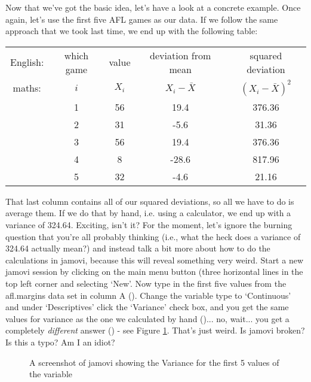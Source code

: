 Now that we've got the basic idea, let's have a look at a concrete example. Once again, let's use the first five AFL games as our data. If we follow the same approach that we took last time, we end up with the following table:
\begin{center}
\begin{tabular}{ccccc} 
English: & which game & value & deviation from mean & squared deviation \\
maths: & $i$ & $X_i$ & $X_i - \bar{X}$ &  $(X_i - \bar{X})^2$ \\ \hline
& 1 & 56 & 19.4  & 376.36\\
& 2 & 31 &  -5.6 & 31.36\\ 
& 3 & 56 & 19.4  & 376.36\\
& 4 & 8 & -28.6  & 817.96\\
& 5 & 32 & -4.6  & 21.16 \\
\end{tabular}
\end{center}
That last column contains all of our squared deviations, so all we have to do is average them. If we do that by hand, i.e. using a calculator, we end up with a variance of 324.64. Exciting, isn't it? For the moment, let's ignore the burning question that you're all probably thinking (i.e., what the heck does a variance of 324.64 actually mean?) and instead talk a bit more about how to do the calculations in jamovi, because this will reveal something very weird. Start a new jamovi session by clicking on the main menu button (three horizontal lines in the top left corner and selecting `New'. Now type in the first five values from the afl.margins data set in column A (). Change the variable type to `Continuous' and under `Descriptives' click the `Variance' check box, and you get the same values for variance as the one we calculated by hand ()... no, wait... you get a completely {\it different} answer () - see Figure \ref{fig:aflsmall_margins_variance1}. That's just weird. Is jamovi broken? Is this a typo? Am I an idiot? 

\vspace{1cm}
\begin{figure}[ht]
\begin{center}
\caption{A screenshot of jamovi showing the Variance for the first 5 values of the  variable }
\label{fig:aflsmall_margins_variance1}
\HR
\end{center}
\end{figure}

